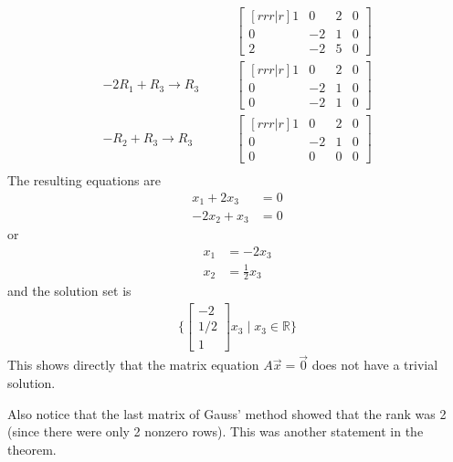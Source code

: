 \begin{example}
\begin{align*}
& \qquad \begin{bmatrix}[rrr|r]
1 & 0 & 2 & 0 \\
0 & -2 & 1 & 0 \\
2 & -2 & 5  & 0
\end{bmatrix} \\
-2 R_1 + R_3 \rightarrow R_3
& \qquad \begin{bmatrix}[rrr|r]
1 & 0 & 2 & 0 \\
0 & -2 & 1 & 0 \\
0 & -2 & 1  & 0
\end{bmatrix} \\
-R_2 + R_3 \rightarrow R_3
& \qquad \begin{bmatrix}[rrr|r]
1 & 0 & 2 & 0 \\
0 & -2 & 1 & 0 \\
0 & 0 & 0  & 0
\end{bmatrix} \\
\end{align*}
The resulting equations are
%
\begin{align*}
x_1 + 2x_3 & = 0 \\
-2x_2 + x_3 & = 0
\end{align*}
or
\begin{align*}
x_1 & = -2x_3 \\
x_2 & = \frac{1}{2} x_3
\end{align*}
and the solution set is
%
\begin{align*}
\{ \begin{bmatrix}
-2 \\ 1/2 \\ 1
\end{bmatrix} x_3 \; | \; x_3 \in \mathbb{R} \}
\end{align*}
This shows directly that the matrix equation $A\vec{x}=\vec{0}$ does not have a trivial solution.
\end{example}

Also notice that the last matrix of Gauss' method showed that the rank was 2 (since there were only 2 nonzero rows).  This was another statement in the theorem.

